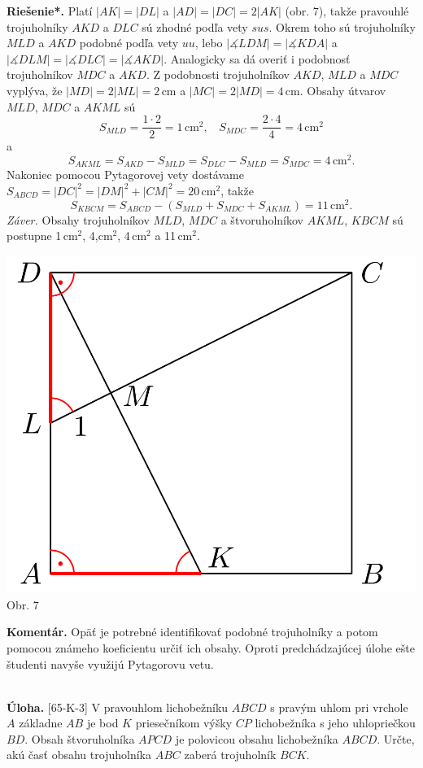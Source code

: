 \documentclass[11pt,a4paper,oneside,final]{book}
\newcommand{\kom}{\textbf{Komentár.} }
\newcommand{\ul}{\textbf{Úloha.} }
\newcommand{\rieh}{\textbf{Riešenie*.} }
\newcommand{\ma}{\measuredangle}
\begin{document}
\rieh Platí $|AK| = |DL|$ a $|AD| = |DC| = 2|AK|$ (obr. 7), takže pravouhlé trojuholníky $AKD$ a $DLC$ sú zhodné podľa vety $sus$. Okrem toho sú trojuholníky $MLD$ a $AKD$ podobné podľa vety $uu$, lebo $|\ma LDM| = |\ma KDA|$ a $|\ma DLM| = |\ma DLC| = |\ma AKD|$. Analogicky sa dá overiť i podobnosť trojuholníkov $MDC$ a $AKD$. Z podobnosti trojuholníkov $AKD$, $MLD$ a $MDC$ vyplýva, že $|MD| = 2|ML| = 2$\,cm a $|MC| = 2|MD| = 4$\,cm. Obsahy útvarov $MLD$, $MDC$ a $AKML$ sú
$$S_{MLD} =\frac{1\cdot 2}{2}= 1\,\text{cm}^2, \ \ \ \  S_{MDC} = \frac{2\cdot 4}{4}= 4\,\text{cm}^2$$
a
$$S_{AKML} = S_{AKD}- S_{MLD} = S_{DLC} - S_{MLD} = S_{MDC} = 4\,\text{cm}^2.$$
Nakoniec pomocou Pytagorovej vety dostávame $S_{ABCD} = |DC|^2 = |DM|^2 + |CM|^2= 20$\,cm$^2$, takže
$$S_{KBCM} = S_{ABCD} - (S_{MLD} + S_{MDC} + S_{AKML}) = 11\,\text{cm}^2.$$
\textit{Záver.} Obsahy trojuholníkov $MLD$, $MDC$ a štvoruholníkov $AKML$, $KBCM$ sú postupne 1\,cm$^2$, 4,cm$^2$, 4\,cm$^2$ a 11\,cm$^2$.
\begin{center}
\includegraphics[scale=0.3]{63D41} \\ %

Obr. 7
\end{center}
\kom Opäť je potrebné identifikovať podobné trojuholníky a potom pomocou známeho koeficientu určiť ich obsahy. Oproti predchádzajúcej úlohe ešte študenti navyše využijú Pytagorovu vetu.\\
\\
\begin{tcolorbox}[breakable,notitle,boxrule=0pt,colback=light-gray,colframe=light-gray]\ul [65-K-3] V pravouhlom lichobežníku $ABCD$ s pravým uhlom pri vrchole $A$ základne $AB$ je bod $K$ priesečníkom výšky $CP$ lichobežníka s jeho uhlopriečkou $BD$. Obsah štvoruholníka $APCD$ je polovicou obsahu lichobežníka $ABCD$. Určte, akú časť obsahu trojuholníka $ABC$ zaberá trojuholník $BCK$.

\end{tcolorbox}
\end{document}

